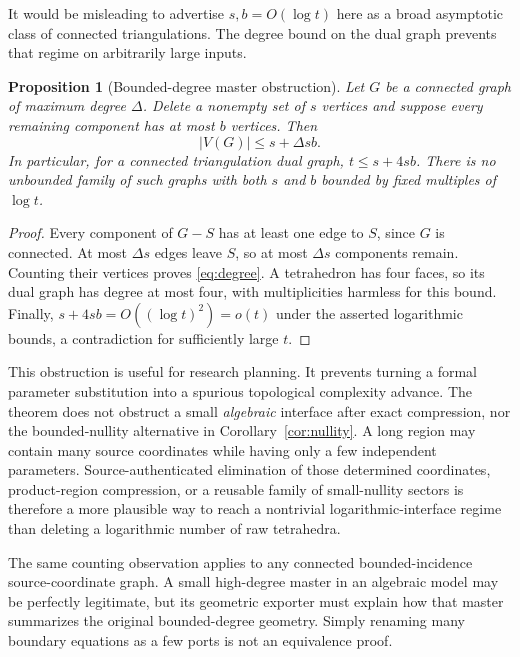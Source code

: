 \documentclass[11pt,a4paper]{article}
\newtheorem{proposition}[theorem]{Proposition}
\theoremstyle{definition}
\theoremstyle{remark}
\begin{document}
It would be misleading to advertise $s,b=O(\log t)$ here as a broad asymptotic class of connected triangulations. The degree bound on the dual graph prevents that regime on arbitrarily large inputs.

\begin{proposition}[Bounded-degree master obstruction]
\label{prop:degree}
Let $G$ be a connected graph of maximum degree $\Delta$. Delete a nonempty set of $s$ vertices and suppose every remaining component has at most $b$ vertices. Then
\begin{equation}
 |V(G)|\le s+\Delta sb.
 \label{eq:degree}
\end{equation}
In particular, for a connected triangulation dual graph, $t\le s+4sb$. There is no unbounded family of such graphs with both $s$ and $b$ bounded by fixed multiples of $\log t$.
\end{proposition}
\begin{proof}
Every component of $G-S$ has at least one edge to $S$, since $G$ is connected. At most $\Delta s$ edges leave $S$, so at most $\Delta s$ components remain. Counting their vertices proves \eqref{eq:degree}. A tetrahedron has four faces, so its dual graph has degree at most four, with multiplicities harmless for this bound. Finally, $s+4sb=O((\log t)^2)=o(t)$ under the asserted logarithmic bounds, a contradiction for sufficiently large $t$.
\end{proof}

This obstruction is useful for research planning. It prevents turning a formal parameter substitution into a spurious topological complexity advance. The theorem does not obstruct a small \emph{algebraic} interface after exact compression, nor the bounded-nullity alternative in Corollary~\ref{cor:nullity}. A long region may contain many source coordinates while having only a few independent parameters. Source-authenticated elimination of those determined coordinates, product-region compression, or a reusable family of small-nullity sectors is therefore a more plausible way to reach a nontrivial logarithmic-interface regime than deleting a logarithmic number of raw tetrahedra.

The same counting observation applies to any connected bounded-incidence source-coordinate graph. A small high-degree master in an algebraic model may be perfectly legitimate, but its geometric exporter must explain how that master summarizes the original bounded-degree geometry. Simply renaming many boundary equations as a few ports is not an equivalence proof.
\end{document}
